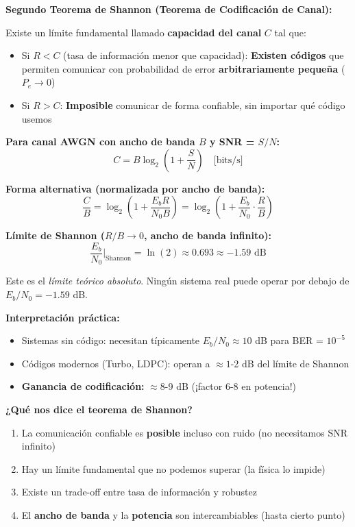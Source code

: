 \documentclass[10pt,a4paper]{article}
\begin{document}
\begin{tcolorbox}[colback=verdeclaro!10,colframe=verdeclaro,title=⚡ TEOREMA DE SHANNON - Resultado más importante]
\textbf{Segundo Teorema de Shannon (Teorema de Codificación de Canal):}

Existe un límite fundamental llamado \textbf{capacidad del canal} $C$ tal que:
\begin{itemize}
\item Si $R < C$ (tasa de información menor que capacidad): \textbf{Existen códigos} que permiten comunicar con probabilidad de error \textbf{arbitrariamente pequeña} ($P_e \to 0$)
\item Si $R > C$: \textbf{Imposible} comunicar de forma confiable, sin importar qué código usemos
\end{itemize}

\textbf{Para canal AWGN con ancho de banda $B$ y SNR = $S/N$:}
$$\boxed{C = B\log_2\left(1 + \frac{S}{N}\right) \quad \text{[bits/s]}}$$

\textbf{Forma alternativa (normalizada por ancho de banda):}
$$\frac{C}{B} = \log_2\left(1 + \frac{E_b R}{N_0 B}\right) = \log_2\left(1 + \frac{E_b}{N_0} \cdot \frac{R}{B}\right)$$

\textbf{Límite de Shannon ($R/B \to 0$, ancho de banda infinito):}
$$\frac{E_b}{N_0}\bigg|_{\text{Shannon}} = \ln(2) \approx 0.693 \approx -1.59 \text{ dB}$$

Este es el \emph{límite teórico absoluto}. Ningún sistema real puede operar por debajo de $E_b/N_0 = -1.59$ dB.

\textbf{Interpretación práctica:}
\begin{itemize}
\item Sistemas sin código: necesitan típicamente $E_b/N_0 \approx 10$ dB para BER = $10^{-5}$
\item Códigos modernos (Turbo, LDPC): operan a $\approx 1$-2 dB del límite de Shannon
\item \textbf{Ganancia de codificación:} $\approx 8$-9 dB (¡factor 6-8 en potencia!)
\end{itemize}
\end{tcolorbox}

\textbf{¿Qué nos dice el teorema de Shannon?}
\begin{enumerate}
\item La comunicación confiable es \textbf{posible} incluso con ruido (no necesitamos SNR infinito)
\item Hay un límite fundamental que no podemos superar (la física lo impide)
\item Existe un trade-off entre tasa de información y robustez
\item El \textbf{ancho de banda} y la \textbf{potencia} son intercambiables (hasta cierto punto)
\end{enumerate}
\end{document}
